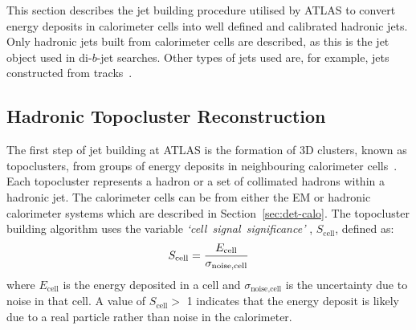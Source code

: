 This section describes the jet building procedure utilised by ATLAS
to convert energy deposits in calorimeter cells into well defined and calibrated hadronic jets.
Only hadronic jets built from calorimeter cells are described,
as this is the jet object used in di-$b$-jet searches.
Other types of jets used %
are, for example, jets constructed from tracks~\cite{obj-Hbb_exotic}.

\newpage
\subsection{Hadronic Topocluster Reconstruction}
\label{sec:obj-jets_topo}

The first step of jet building at ATLAS is the formation of 3D clusters, known as topoclusters, from groups of energy deposits in neighbouring calorimeter cells~\cite{obj-jets_topo}.
Each topocluster represents a hadron or a set of collimated hadrons within a hadronic jet.
The calorimeter cells can be from either the EM or hadronic calorimeter systems which are described in Section~\ref{sec:det-calo}.
The topocluster building algorithm uses the variable \mbox{\textit{`cell signal significance'}}
, $S_{\text{cell}}$, defined as:
\begin{equation}
  \vspace{0.2em}
  {S_{\text{cell}} = \frac{E_{\text{cell}}}{\sigma_{\text{noise,cell}}}}
\end{equation}
where $E_{\text{cell}}$ is the energy deposited in a cell
and $\sigma_{\text{noise,cell}}$ is the uncertainty due to noise in that cell.
A value of $S_{\text{cell}} >$ 1 indicates that the energy deposit is likely due to a real particle rather than noise in the calorimeter.

